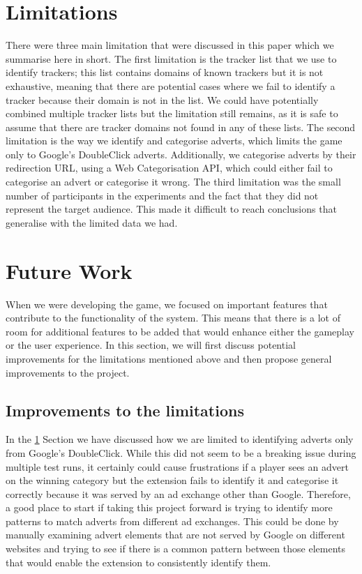 \documentclass{l4proj}
\begin{document}
\section{Limitations}
\label{limitations}
There were three main limitation that were discussed in this paper which we summarise here in short. The first limitation is the tracker list that we use to identify trackers; this list contains domains of known trackers but it is not exhaustive, meaning that there are potential cases where we fail to identify a tracker because their domain is not in the list. We could have potentially combined multiple tracker lists but the limitation still remains, as it is safe to assume that there are tracker domains not found in any of these lists. The second limitation is the way we identify and categorise adverts, which limits the game only to Google's DoubleClick adverts. Additionally, we categorise adverts by their redirection URL, using a Web Categorisation API, which could either fail to categorise an advert or categorise it wrong. The third limitation was the small number of participants in the experiments and the fact that they did not represent the target audience. This made it difficult to reach conclusions that generalise with the limited data we had.

\section{Future Work}
When we were developing the game, we focused on important features that contribute to the functionality of the system. This means that there is a lot of room for additional features to be added that would enhance either the gameplay or the user experience. In this section, we will first discuss potential improvements for the limitations mentioned above and then propose general improvements to the project.

\subsection{Improvements to the limitations}
In the \ref{limitations} Section we have discussed how we are limited to identifying adverts only from Google's DoubleClick. While this did not seem to be a breaking issue during multiple test runs, it certainly could cause frustrations if a player sees an advert on the winning category but the extension fails to identify it and categorise it correctly because it was served by an ad exchange other than Google. Therefore, a good place to start if taking this project forward is trying to identify more patterns to match adverts from different ad exchanges. This could be done by manually examining advert elements that are not served by Google on different websites and trying to see if there is a common pattern between those elements that would enable the extension to consistently identify them. 
\end{document}
